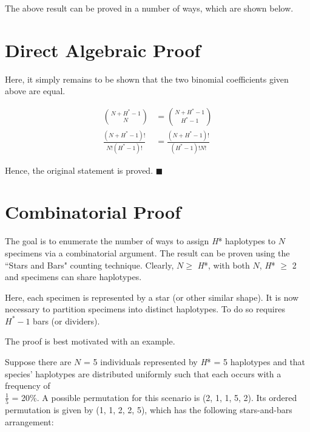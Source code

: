 \noindent The above result can be proved in a number of ways, which are shown below.

\section{Direct Algebraic Proof}

Here, it simply remains to be shown that the two binomial coefficients given above are equal. 

\vspace{5mm}

\begin{align*}
\binom{N + H^* - 1}{N} &= \binom{N + H^* - 1}{H^* - 1} \\
\frac{(N + H^* - 1)!}{N!(H^* - 1)!} &= \frac{(N + H^* - 1)!}{(H^* - 1)!N!}  
\end{align*} 

Hence, the original statement is proved. $\blacksquare$ 



\section{Combinatorial Proof}

The goal is to enumerate the number of ways to assign \textit{H}* haplotypes to $N$ specimens via a combinatorial argument. The result can be proven using the ``Stars and Bars" counting technique. Clearly, $N \geq$ \textit{H}*, with both $N$, \textit{H}* $\geq$ 2 and specimens can share haplotypes.

\vspace{5mm} 

Here, each specimen is represented by a star (or other similar shape). It is now necessary to partition specimens into distinct haplotypes. To do so requires $H^* - 1$ bars (or dividers). 

\vspace{5mm}

The proof is best motivated with an example.

\vspace{5mm}

Suppose there are $N$ = 5 individuals represented by \textit{H}* = 5 haplotypes and that species' haplotypes are distributed uniformly such that each occurs with a frequency of \\ $\frac{1}{5}$ = 20\%. A possible permutation for this scenario is (2, 1, 1, 5, 2). Its ordered permutation is given by (1, 1, 2, 2, 5), which has the following stars-and-bars arrangement:

